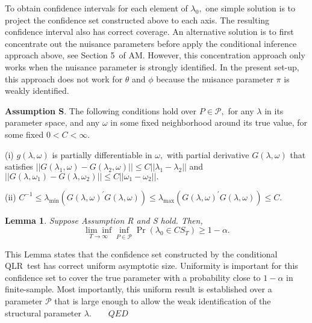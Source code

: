 \documentclass[11pt]{article}
\newtheorem{lemma}{Lemma}[section]
\begin{document}
\smallskip

To obtain confidence intervals for each element of $\lambda _{0},$ one
simple solution is to project the confidence set constructed above to each
axis. The resulting confidence interval also has correct coverage. An
alternative solution is to first concentrate out the nuisance parameters
before apply the conditional inference approach above, see Section 5\ of AM.
However, this concentration approach only works when the nuisance parameter
is strongly identified. In the present set-up, this approach does not work
for $\theta $ and $\phi $ because the nuisance parameter $\pi $ is weakly
identified.

\smallskip

\noindent \textbf{Assumption S}. The following conditions hold over $P\in 
\mathcal{P},$ for any $\lambda $ in its parameter space, and any $\omega $
in some fixed neighborhood around its true value, for some fixed $0<C<\infty
.$

\noindent (i) $g(\lambda ,\omega )$ is partially differentiable in $\omega ,$
with partial derivative $G(\lambda ,\omega )$ that satisfies $||G(\lambda
_{1},\omega )-G(\lambda _{2},\omega )||\leq C||\lambda _{1}-\lambda _{2}||$
and $||G(\lambda ,\omega _{1})-G(\lambda ,\omega _{2})||\leq C||\omega
_{1}-\omega _{2}||.$

\noindent (ii) $C^{-1}\leq \lambda _{\min }(G(\lambda ,\omega )^{\prime
}G(\lambda ,\omega ))\leq \lambda _{\max }(G(\lambda ,\omega )^{\prime
}G(\lambda ,\omega ))\leq C$.

\smallskip

\begin{lemma}
\label{Lemma CS}Suppose Assumption R and S hold. Then, 
\begin{equation*}
\underset{T\rightarrow \infty }{\lim \inf }\underset{P\in \mathcal{P}}{\inf }%
\Pr \left( \lambda _{0}\in CS_{T}\right) \geq 1-\alpha .
\end{equation*}
\end{lemma}

This Lemma states that the confidence set constructed by the conditional
QLR\ test has correct uniform asymptotic size. Uniformity is important for
this confidence set to cover the true parameter with a probability close to $%
1-\alpha $ in finite-sample. Most importantly, this uniform result is
established over a parameter $\mathcal{P}$ that is large enough to allow the
weak identification of the structural parameter $\lambda .\qquad QED$

\bigskip
\end{document}

